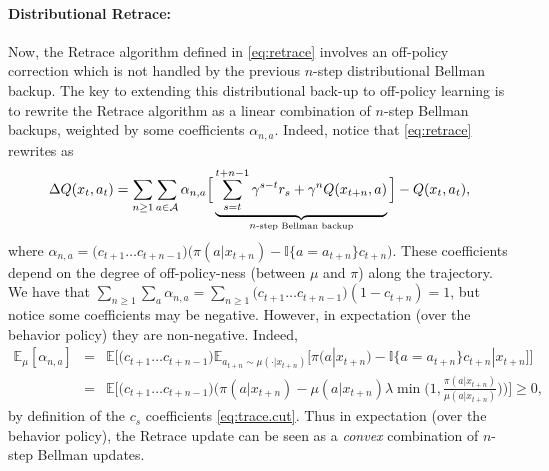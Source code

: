 \documentclass{article}
\newcommand{\beqan}{\begin{eqnarray*}}
\newcommand{\eeqan}{\end{eqnarray*}}
\newcommand{\E}{{\mathbb E}}
\begin{document}

\paragraph{Distributional Retrace:} Now, the Retrace algorithm defined in 
\eqref{eq:retrace} involves an off-policy correction which is not handled by the 
previous $n$-step distributional Bellman backup. The key to extending this 
distributional back-up to off-policy learning is to rewrite the Retrace algorithm as a linear 
combination 
of $n$-step Bellman backups, weighted by some coefficients $\alpha_{n,a} $. 
Indeed, notice that \eqref{eq:retrace} rewrites as
\beqan
\Delta Q(x_t, a_t) = \sum_{n\geq 1} \sum_{a\in \mathcal{A}} \alpha_{n,a} \Big[ 
\underbrace{ \sum_{s=t}^{t+n-1} 
\gamma^{s-t} r_s + \gamma^n Q(x_{t+n},a)}_{n\mbox{\tiny -step Bellman backup}} 
\Big] - Q(x_t, a_t),
\eeqan
where $\alpha_{n,a} = \big(c_{t+1}\dots c_{t+n-1}\big) \big( \pi(a|x_{t+n}) - 
{\mathbb I}\{a=a_{t+n}\} c_{t+n}\big)$. These coefficients depend on the degree 
of off-policy-ness (between $\mu$ and $\pi$) along the trajectory. We have that 
$\sum_{n\geq 1}\sum_a \alpha_{n,a} = \sum_{n\geq 1} \big(c_{t+1}\dots c_{t+n-1}\big) (1 - 
c_{t+n}) = 1$, but notice some coefficients may be negative. However, in 
expectation (over the behavior policy) they are non-negative. Indeed, 
\beqan
\E_{\mu}[\alpha_{n,a}] &=& \E\Big[\big(c_{t+1}\dots c_{t+n-1}\big) 
\E_{a_{t+n}\sim\mu(\cdot|x_{t+n})}\big[ \pi(a|x_{t+n}) - {\mathbb 
I}\{a=a_{t+n}\}c_{t+n} |x_{t+n}\big] \Big] \\
&=& \E\Big[\big(c_{t+1}\dots c_{t+n-1}\big)  \Big( \pi(a|x_{t+n}) - 
\mu(a|x_{t+n}) \lambda \min\big(1, 
\frac{\pi(a|x_{t+n})}{\mu(a|x_{t+n})}\big)\Big) 
\Big]\geq 0,
\eeqan
by definition of the $c_s$ coefficients \eqref{eq:trace.cut}. 
Thus in expectation (over the behavior policy), the Retrace update can be seen 
as a {\em convex} combination of $n$-step Bellman updates.
\end{document}
